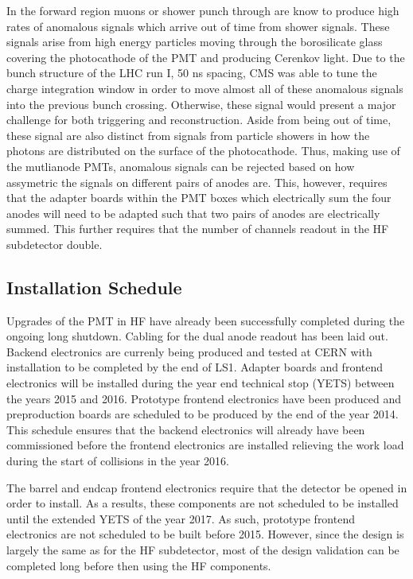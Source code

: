 \documentclass[11pt]{article} %
\begin{document}
In the forward region muons or shower punch through are know to produce high rates of anomalous signals 
which arrive out of time from shower signals.  These signals arise from high energy particles moving through
the borosilicate glass covering the photocathode of the PMT and producing Cerenkov light.  Due to the bunch 
structure of the LHC run I, 50 ns spacing, CMS was able to tune the charge integration window in order to move 
almost all of these anomalous signals into the previous bunch crossing.  Otherwise, these signal would present 
a major challenge for both triggering and reconstruction.  Aside from being out of time, these signal are also 
distinct from signals from particle showers in how the photons are distributed on the surface of the photocathode.
Thus, making use of the mutlianode PMTs, anomalous signals can be rejected based on how assymetric the 
signals on different pairs of anodes are.  This, however, requires that the adapter boards within the PMT boxes 
which electrically sum the four anodes will need to be adapted such that two pairs of anodes are electrically 
summed.  This further requires that the number of channels readout in the HF subdetector double.  

\subsection{Installation Schedule}

Upgrades of the PMT in HF have already been successfully completed during the ongoing long shutdown.
Cabling for the dual anode readout has been laid out.  Backend electronics are currenly being produced and tested
at CERN with installation to be completed by the end of LS1.  Adapter boards and frontend electronics
will be installed during the year end technical stop (YETS) between the years 2015 and 2016.  Prototype frontend
electronics have been produced and preproduction boards are scheduled to be produced by the end of the
year 2014.  This schedule ensures that the backend electronics will already have been commissioned before 
the frontend electronics are installed relieving the work load during the start of collisions in the year 2016.  

The barrel and endcap frontend electronics require that the detector be opened in order to install.  As a results, 
these components are not scheduled to be installed until the extended YETS of the year 2017.    As such, prototype 
frontend electronics are not scheduled to be built before 2015.  However, since the design is largely the same 
as for the HF subdetector, most of the design validation can be completed long before then using the HF components.  
\end{document}
